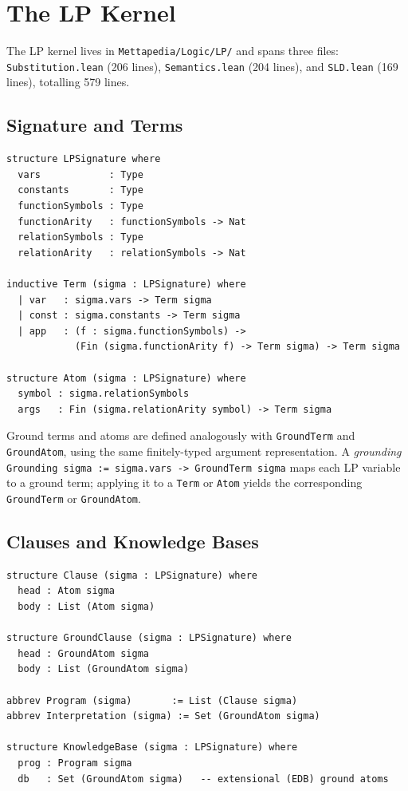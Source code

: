 \documentclass[]{article}
\newcommand{\code}[1]{\texttt{#1}}
\begin{document}
\section{The LP Kernel}
\label{sec:lp-kernel}

The LP kernel lives in \code{Mettapedia/Logic/LP/} and spans three files:
\code{Substitution.lean} (206 lines), \code{Semantics.lean} (204 lines), and
\code{SLD.lean} (169 lines), totalling 579 lines.

\subsection{Signature and Terms}

\begin{lstlisting}[language=lean]
structure LPSignature where
  vars            : Type
  constants       : Type
  functionSymbols : Type
  functionArity   : functionSymbols -> Nat
  relationSymbols : Type
  relationArity   : relationSymbols -> Nat

inductive Term (sigma : LPSignature) where
  | var   : sigma.vars -> Term sigma
  | const : sigma.constants -> Term sigma
  | app   : (f : sigma.functionSymbols) ->
            (Fin (sigma.functionArity f) -> Term sigma) -> Term sigma

structure Atom (sigma : LPSignature) where
  symbol : sigma.relationSymbols
  args   : Fin (sigma.relationArity symbol) -> Term sigma
\end{lstlisting}

Ground terms and atoms are defined analogously with \code{GroundTerm} and
\code{GroundAtom}, using the same finitely-typed argument representation.  A
\emph{grounding} \code{Grounding sigma := sigma.vars -> GroundTerm sigma}
maps each LP variable to a ground term; applying it to a \code{Term} or \code{Atom}
yields the corresponding \code{GroundTerm} or \code{GroundAtom}.

\subsection{Clauses and Knowledge Bases}

\begin{lstlisting}[language=lean]
structure Clause (sigma : LPSignature) where
  head : Atom sigma
  body : List (Atom sigma)

structure GroundClause (sigma : LPSignature) where
  head : GroundAtom sigma
  body : List (GroundAtom sigma)

abbrev Program (sigma)       := List (Clause sigma)
abbrev Interpretation (sigma) := Set (GroundAtom sigma)

structure KnowledgeBase (sigma : LPSignature) where
  prog : Program sigma
  db   : Set (GroundAtom sigma)   -- extensional (EDB) ground atoms
\end{lstlisting}
\end{document}
